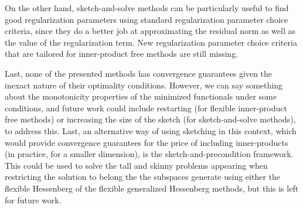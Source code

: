 \documentclass[11pt]{article}
\numberwithin{equation}{section}
\begin{document}
On the other hand, sketch-and-solve methods can be particularly useful to  find good regularization parameters using standard regularization parameter choice criteria, since they do a better job at approximating the residual norm as well as the value of the regularization term. New  regularization parameter choice criteria that are tailored for inner-product free methods are still missing.

Last, none of the presented methods has convergence guarantees given the inexact nature of their optimality conditions. However, we can say something about the monotonicity properties of the minimized functionals under some conditions, and future work could include restarting (for flexible inner-product free methods) or increasing the size of the sketch (for sketch-and-solve methods), to address this. Last, an alternative way of using sketching in this context, which would provide convergence guarantees for the price of including inner-products (in practice, for a smaller dimension), is the sketch-and-precondition framework. This could be used to solve the tall and skinny problems appearing when restricting the solution to belong the the subspaces generate using either the flexible Hessenberg of the flexible generalized Hessenberg methods, but this is left for future work.



\end{document}
